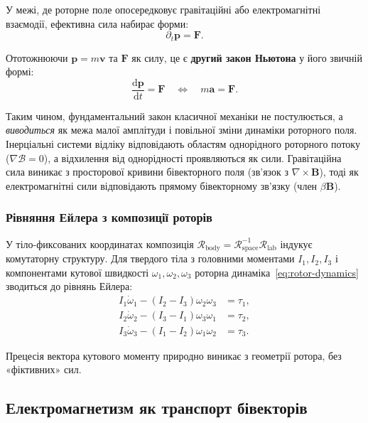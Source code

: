 \documentclass[11pt,a4paper]{article}
\newcommand{\Rotor}{\mathcal{R}}
\newcommand{\Biv}{\mathcal{B}}
\newcommand{\D}{\nabla}                        %
\theoremstyle{definition}
\theoremstyle{plain}
\theoremstyle{remark}
\begin{document}
У межі, де роторне поле опосередковує гравітаційні або електромагнітні взаємодії, ефективна сила набирає форми:
\begin{equation}
\partial_t \mathbf{p} = \mathbf{F}.
\label{eq:newton-translational}
\end{equation}

Ототожнюючи $\mathbf{p} = m\mathbf{v}$ та $\mathbf{F}$ як силу, це є \textbf{другий закон Ньютона} у його звичній формі:
\begin{equation}
\boxed{\frac{\mathrm{d}\mathbf{p}}{\mathrm{d}t} = \mathbf{F} \quad \Longleftrightarrow \quad m\mathbf{a} = \mathbf{F}.}
\label{eq:newton-final}
\end{equation}

Таким чином, фундаментальний закон класичної механіки не постулюється, а \emph{виводиться} як межа малої амплітуди і повільної зміни динаміки роторного поля. Інерціальні системи відліку відповідають областям однорідного роторного потоку ($\D\Biv = 0$), а відхилення від однорідності проявляються як сили. Гравітаційна сила виникає з просторової кривини бівекторного поля (зв'язок з $\nabla \times \mathbf{B}$), тоді як електромагнітні сили відповідають прямому бівекторному зв'язку (член $\beta\mathbf{B}$).

\subsubsection{Рівняння Ейлера з композиції роторів}

У тіло-фиксованих координатах композиція $\Rotor_{\text{body}} = \Rotor_{\text{space}}^{-1} \Rotor_{\text{lab}}$ індукує комутаторну структуру. Для твердого тіла з головними моментами $I_1, I_2, I_3$ і компонентами кутової швидкості $\omega_1, \omega_2, \omega_3$ роторна динаміка~\eqref{eq:rotor-dynamics} зводиться до рівнянь Ейлера:
\begin{align}
I_1 \dot{\omega}_1 - (I_2 - I_3)\omega_2\omega_3 &= \tau_1, \\
I_2 \dot{\omega}_2 - (I_3 - I_1)\omega_3\omega_1 &= \tau_2, \\
I_3 \dot{\omega}_3 - (I_1 - I_2)\omega_1\omega_2 &= \tau_3.
\end{align}

Прецесія вектора кутового моменту природно виникає з геометрії ротора, без «фіктивних» сил.

\subsection{Електромагнетизм як транспорт бівекторів}
\end{document}
